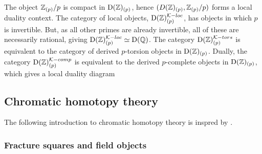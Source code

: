 \begin{example}
    The object $\mathbb{Z}_{(p)}/p$ is compact in $\mathrm{D}(\mathbb{Z})_{(p)}$, hence $(D(\mathbb{Z})_{(p)}, \mathbb{Z}_{(p)}/p)$ forms a local duality context. The category of local objects, $\mathrm{D}(\mathbb{Z})_{(p)}^{\mathcal{K}-loc}$, has objects in which $p$ is invertible. But, as all other primes are already invertible, all of these are necessarily rational, giving $\mathrm{D}(\mathbb{Z})_{(p)}^{\mathcal{K}-loc} \simeq \mathrm{D}(\mathbb{Q})$. The category $\mathrm{D}(\mathbb{Z})_{(p)}^{\mathcal{K}-tors}$ is equivalent to the category of derived $p$-torsion objects in $\mathrm{D}(\mathbb{Z})_{(p)}$. Dually, the category $\mathrm{D}(\mathbb{Z})_{(p)}^{\mathcal{K}-comp}$ is equivalent to the derived $p$-complete objects in $\mathrm{D}(\mathbb{Z})_{(p)}$, which gives a local duality diagram 
    \begin{center}
    \end{center}
\end{example}












\subsection{Chromatic homotopy theory}
\label{ch1:ssec:chromatic-homotopy-theory}

The following introduction to chromatic homotopy theory is inspred by \cite{barthel-beaudry_19}. 

\subsubsection{Fracture squares and field objects}
\label{sssec:fracture-squares}

